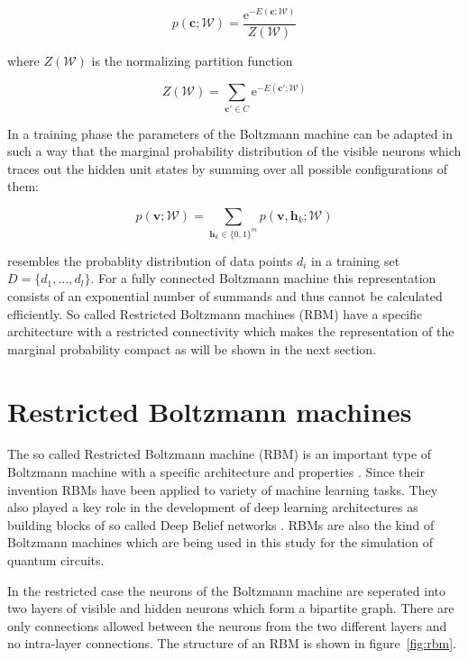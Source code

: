\begin{equation}
   p(\bm{c};\mathcal{W}) = \frac{\mathrm{e}^{-E(\bm{c};\mathcal{W})}}{Z(\mathcal{W})}
\end{equation}

where $Z(\mathcal{W})$ is the normalizing partition function 

\begin{equation}
   Z(\mathcal{W}) = \sum_{\bm{c}\prime\in C} \mathrm{e}^{-E(\bm{c}\prime;\mathcal{W})}
\end{equation}

In a training phase the parameters of the Boltzmann machine can be adapted in such a way that 
the marginal probability distribution of the visible neurons which traces out the hidden unit 
states by summing over all possible configurations of them:

\begin{equation}
   p(\bm{v};\mathcal{W}) = \sum_{\bm{h}_k \in \{0,1\}^m} p(\bm{v},\bm{h}_k;\mathcal{W})
\end{equation}

resembles the probablity distribution of data points $d_i$ in a training set $D=\{d_1,\dots,d_l\}$.
For a fully connected Boltzmann machine this representation consists of an exponential number of 
summands and thus cannot be calculated efficiently. So called Restricted Boltzmann machines
(RBM) have a specific architecture with a restricted connectivity which makes the representation 
of the marginal probability compact as will be shown in the next section.

\section{Restricted Boltzmann machines}
The so called Restricted Boltzmann machine (RBM) is an important type of Boltzmann machine with 
a specific architecture and properties \cite{smolensky1986information}. Since their invention RBMs have been applied to variety 
of machine learning tasks. They also played a 
key role in the development of deep learning architectures as building blocks of so called 
Deep Belief networks \cite{bengio2009learning, hinton2006fast}.
RBMs are also the kind of Boltzmann machines which are being used in this study for the simulation 
of quantum circuits.

In the restricted case the neurons of the Boltzmann machine are seperated into two layers of visible and hidden neurons which form a bipartite graph. There 
are only connections allowed between the neurons from the two different layers and no intra-layer connections. The structure of an 
RBM is shown in figure~\ref{fig:rbm}. 

